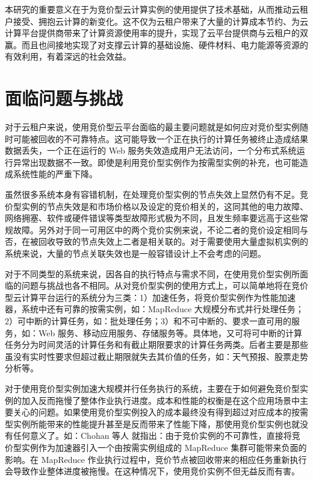 本研究的重要意义在于为竞价型云计算实例的使用提供了技术基础，从而推动云租户接受、拥抱云计算的新变化。这不仅为云租户带来了大量的计算成本节约、为云计算平台提供商带来了计算资源使用率的提升，实现了云平台提供商与云租户的双赢。而且也间接地实现了对支撑云计算的基础设施、硬件材料、电力能源等资源的有效利用，有着深远的社会效益。

\section{面临问题与挑战}
对于云租户来说，使用竞价型云平台面临的最主要问题就是如何应对竞价型实例随时可能被回收的不可靠特点。这可能导致一个正在执行的计算任务被终止造成结果数据丢失，一个正在运行的 Web 服务失效造成用户无法访问，一个分布式系统运行异常出现数据不一致。即使是利用竞价型实例作为按需型实例的补充，也可能造成系统性能的严重下降。

虽然很多系统本身有容错机制，在处理竞价型实例的节点失效上显然仍有不足。竞价型实例的节点失效是和市场价格以及设定的竞价相关的，这同其他的电力故障、网络拥塞、软件或硬件错误等类型故障形式极为不同，且发生频率要远高于这些常规故障。另外对于同一可用区中的两个竞价实例来说，不论二者的竞价设定相同与否，在被回收导致的节点失效上二者是相关联的。对于需要使用大量虚拟机实例的系统来说，大量的节点关联失效也是一般容错设计上不会考虑的问题。

对于不同类型的系统来说，因各自的执行特点与需求不同，在使用竞价型实例所面临的问题与挑战也各不相同。从对竞价型实例的使用方式上，可以简单地将在竞价型云计算平台运行的系统分为三类：1）加速任务，将竞价型实例作为性能加速器，系统中还有可靠的按需实例，如：MapReduce 大规模分布式并行处理任务；2）可中断的计算任务，如：批处理任务；3）和不可中断的、要求一直可用的服务，如：Web 服务、移动应用服务、存储服务等。具体地，又可将可中断的计算任务分为时间灵活的计算任务和有截止期限要求的计算任务两类。后者主要是那些虽没有实时性要求但超过截止期限就失去其价值的任务，如：天气预报、股票走势分析等。

对于使用竞价型实例加速大规模并行任务执行的系统，主要在于如何避免竞价型实例的加入反而拖慢了整体作业执行进度。成本和性能的权衡是在这个应用场景中主要关心的问题。如果使用竞价型实例投入的成本最终没有得到超过对应成本的按需型实例所能带来的性能提升甚至是反而带来了性能下降，那使用竞价型实例也就没有任何意义了。如：Chohan 等人 \cite{chohan2010see} 就指出：由于竞价实例的不可靠性，直接将竞价型实例作为加速器引入一个由按需实例组成的 MapReduce 集群可能带来负面的影响。在 MapReduce 作业执行过程中，竞价节点被回收带来的相应任务重新执行会导致作业整体进度被拖慢。在这种情况下，使用竞价实例不但无益反而有害。

